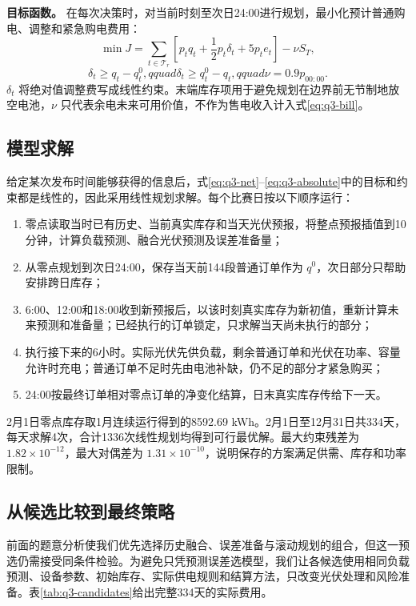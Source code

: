 \textbf{目标函数。} 在每次决策时，对当前时刻至次日24:00进行规划，最小化预计普通购电、调整和紧急购电费用：
\begin{equation}
\min J=\sum_{t\in\mathcal T_r}
\left[p_tq_t+\frac12p_t\delta_t+5p_te_t\right]-\nu S_T,
\label{eq:q3-objective}
\end{equation}
\begin{equation}
\delta_t\ge q_t-q_t^0,qquad \delta_t\ge q_t^0-q_t,qquad
\nu=0.9p_{00:00}.
\label{eq:q3-absolute}
\end{equation}
$\delta_t$ 将绝对值调整费写成线性约束。末端库存项用于避免规划在边界前无节制地放空电池，$\nu$ 只代表余电未来可用价值，不作为售电收入计入式\eqref{eq:q3-bill}。

\subsection{模型求解}

给定某次发布时间能够获得的信息后，式\eqref{eq:q3-net}--\eqref{eq:q3-absolute}中的目标和约束都是线性的，因此采用线性规划求解。每个比赛日按以下顺序运行：
\begin{enumerate}
\item 零点读取当时已有历史、当前真实库存和当天光伏预报，将整点预报插值到10分钟，计算负载预测、融合光伏预测及误差准备量；
\item 从零点规划到次日24:00，保存当天前144段普通订单作为 $q^0$，次日部分只帮助安排跨日库存；
\item 6:00、12:00和18:00收到新预报后，以该时刻真实库存为新初值，重新计算未来预测和准备量；已经执行的订单锁定，只求解当天尚未执行的部分；
\item 执行接下来的6小时。实际光伏先供负载，剩余普通订单和光伏在功率、容量允许时充电；普通订单不足时先由电池补缺，仍不足的部分才紧急购买；
\item 24:00按最终订单相对零点订单的净变化结算，日末真实库存传给下一天。
\end{enumerate}

2月1日零点库存取1月连续运行得到的8592.69 kWh。2月1日至12月31日共334天，每天求解4次，合计1336次线性规划均得到可行最优解。最大约束残差为 $1.82\times10^{-12}$，最大对偶差为 $1.31\times10^{-10}$，说明保存的方案满足供需、库存和功率限制。

\subsection{从候选比较到最终策略}

前面的题意分析使我们优先选择历史融合、误差准备与滚动规划的组合，但这一预选仍需接受同条件检验。为避免只凭预测误差选模型，我们让各候选使用相同负载预测、设备参数、初始库存、实际供电规则和结算方法，只改变光伏处理和风险准备。表\ref{tab:q3-candidates}给出完整334天的实际费用。
\begin{inlinetable}
\caption{问题三候选方案的334天费用比较}\label{tab:q3-candidates}
\end{inlinetable}

